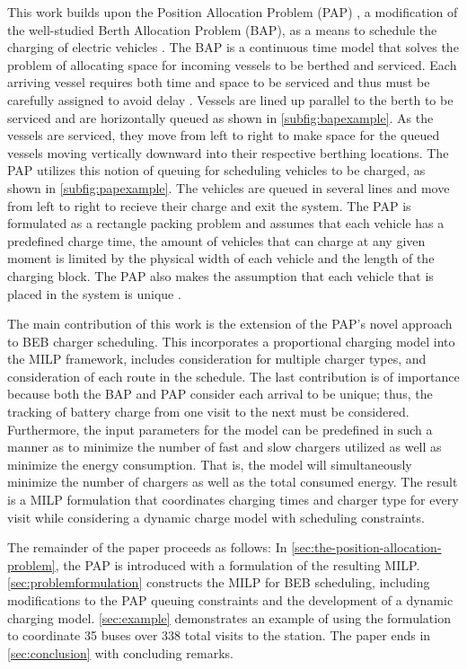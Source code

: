 \documentclass[ee,thesis]{usuthesis}
\newcommand{\A}{35 }                                                            %
\newcommand{\N}{338 }                                                           %
\begin{document}
This work builds upon the Position Allocation Problem (PAP) \cite{qarebagh-2019-optim-sched}, a modification of the
well-studied Berth Allocation Problem (BAP), as a means to schedule the charging of electric vehicles
\cite{buhrkal-2011-model-discr,frojan-2015-contin-berth,imai-2001-dynam-berth}. The BAP is a continuous time model
that solves the problem of allocating space for incoming vessels to be berthed and serviced. Each arriving vessel
requires both time and space to be serviced and thus must be carefully assigned to avoid delay
\cite{imai-2001-dynam-berth}. Vessels are lined up parallel to the berth to be serviced and are horizontally queued as
shown in \autoref{subfig:bapexample}. As the vessels are serviced, they move from left to right to make space for the
queued vessels moving vertically downward into their respective berthing locations. The PAP utilizes this notion of
queuing for scheduling vehicles to be charged, as shown in \autoref{subfig:papexample}. The vehicles are queued in
several lines and move from left to right to recieve their charge and exit the system. The PAP is formulated as a
rectangle packing problem and assumes that each vehicle has a predefined charge time, the amount of vehicles that can
charge at any given moment is limited by the physical width of each vehicle and the length of the charging block. The
PAP also makes the assumption that each vehicle that is placed in the system is unique
\cite{qarebagh-2019-optim-sched}.

The main contribution of this work is the extension of the PAP's novel approach to BEB charger scheduling. This
incorporates a proportional charging model into the MILP framework, includes consideration for multiple charger types,
and consideration of each route in the schedule. The last contribution is of importance because both the BAP and PAP
consider each arrival to be unique; thus, the tracking of battery charge from one visit to the next must be considered.
Furthermore, the input parameters for the model can be predefined in such a manner as to minimize the number of fast and
slow chargers utilized as well as minimize the energy consumption. That is, the model will simultaneously minimize the
number of chargers as well as the total consumed energy. The result is a MILP formulation that coordinates charging
times and charger type for every visit while considering a dynamic charge model with scheduling constraints.

The remainder of the paper proceeds as follows: In \autoref{sec:the-position-allocation-problem}, the PAP is introduced
with a formulation of the resulting MILP. \autoref{sec:problemformulation} constructs the MILP for BEB scheduling,
including modifications to the PAP queuing constraints and the development of a dynamic charging model.
\autoref{sec:example} demonstrates an example of using the formulation to coordinate \A buses over \N total visits to
the station. The paper ends in \autoref{sec:conclusion} with concluding remarks.
\end{document}
